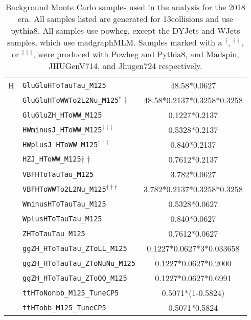 \begin{table}[ht]
\begin{center}
{\begin{tabular}{|c|l|c|}
    \hline
    H & \texttt{GluGluHToTauTau\_M125} & 48.58*0.0627\\
    & \texttt{GluGluHToWWTo2L2Nu\_M125}$^\dagger\dagger$ & 48.58*0.2137*0.3258*0.3258\\
    & \texttt{GluGluZH\_HToWW\_M125} & 0.1227*0.2137\\
    & \texttt{HWminusJ\_HToWW\_M125}$^{\dagger\dagger\dagger}$ & 0.5328*0.2137\\
    & \texttt{HWplusJ\_HToWW\_M125}$^{\dagger\dagger\dagger}$ & 0.840*0.2137\\
    & \texttt{HZJ\_HToWW\_M125}${\dagger\dagger}$ & 0.7612*0.2137\\
    & \texttt{VBFHToTauTau\_M125} & 3.782*0.0627\\
    & \texttt{VBFHToWWTo2L2Nu\_M125}$^{\dagger\dagger\dagger}$ & 3.782*0.2137*0.3258*0.3258\\
    & \texttt{WminusHToTauTau\_M125} & 0.5328*0.0627\\
    & \texttt{WplusHToTauTau\_M125} & 0.840*0.0627\\
    & \texttt{ZHToTauTau\_M125} & 0.7612*0.0627\\
    & \texttt{ggZH\_HToTauTau\_ZToLL\_M125} & 0.1227*0.0627*3*0.033658\\
    & \texttt{ggZH\_HToTauTau\_ZToNuNu\_M125} & 0.1227*0.0627*0.2000\\
    & \texttt{ggZH\_HToTauTau\_ZToQQ\_M125} & 0.1227*0.0627*0.6991\\
    & \texttt{ttHToNonbb\_M125\_TuneCP5} & 0.5071*(1-0.5824)\\
    & \texttt{ttHTobb\_M125\_TuneCP5} & 0.5071*0.5824\\
    \hline
    \end{tabular}
    }
    \end{center}
    \caption{Background Monte Carlo samples used in the analysis for the 2018 era. All samples listed are generated for 13\TeV collisions and use pythia8. All samples use powheg, except the DYJets and WJets samples, which use madgraphMLM. Samples marked with a $^\dagger$, $^{\dagger\dagger}$, or $^{\dagger\dagger\dagger}$, were produced with Powheg and Pythia8, and Madspin, JHUGenV714, and Jhugen724 respectively.}
    \label{tab:2018mcbkg}
    \end{table}
    
    


